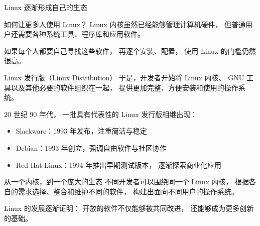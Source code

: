 \documentclass[aspectratio=169]{beamer}
\begin{document}
\begin{frame}[t]{Linux 逐渐形成自己的生态}
	
	\begin{block}{如何让更多人使用 Linux？}
		\hspace*{2em}Linux 内核虽然已经能够管理计算机硬件，
		但普通用户还需要各种系统工具、程序库和应用软件。
		
		\par\hspace*{2em}如果每个人都要自己寻找这些软件，
		再逐个安装、配置，
		使用 Linux 的门槛仍然很高。
	\end{block}
	
	\vspace{0.3cm}
	\pause
	\begin{block}{Linux 发行版（Linux Distribution）}
		\hspace*{2em}于是，开发者开始将 Linux 内核、
		GNU 工具以及其他必要的软件组织在一起，
		提供更加完整、方便安装和使用的操作系统。
		
		\par\hspace*{2em}20 世纪 90 年代，
		一批具有代表性的 Linux 发行版相继出现：
		
		\begin{itemize}
			\item Slackware：1993 年发布，注重简洁与稳定
			\item Debian：1993 年创立，强调自由软件与社区协作
			\item Red Hat Linux：1994 年推出早期测试版本，
			逐渐探索商业化应用
		\end{itemize}
	\end{block}
	
	\vspace{0.3cm}
	
	\begin{block}{从一个内核，到一个庞大的生态}
		\hspace*{2em}不同开发者可以围绕同一个 Linux 内核，
		根据各自的需求选择、整合和维护不同的软件，
		构建出面向不同用户的操作系统。
		
		\par\hspace*{2em}\alert{Linux 的发展逐渐证明：
			开放的软件不仅能够被共同改进，
			还能够成为更多创新的基础。}
	\end{block}
	
\end{frame}
\end{document}

